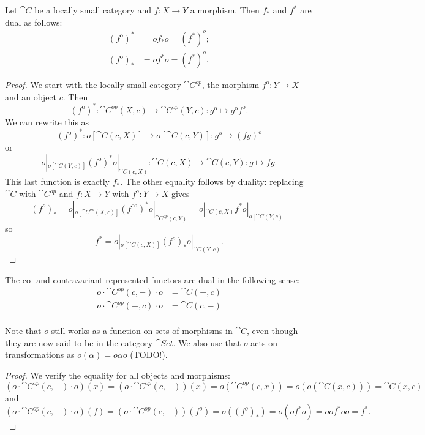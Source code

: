 \begin{proposition}
Let $\cat{C}$ be a locally small category and $f: X\to Y$ a morphism. Then $f_*$ and $f^*$ are dual as follows:
\begin{align*}
(f^\text{o})^* &= of_*o = (f^*)^o; \\
(f^\text{o})_* &= of^*o = (f^*)^o.
\end{align*}
\end{proposition}
\begin{proof}
We start with the locally small category $\cat{C^{op}}$, the morphism $f^\text{o}: Y\to X$ and an object $c$. Then 
\[ (f^\text{o})^*: \cat{C^{op}}(X,c) \to \cat{C^{op}}(Y,c): g^\text{o} \mapsto g^\text{o}f^\text{o}. \]
We can rewrite this as
\[ (f^\text{o})^*: o[\cat{C}(c,X)] \to o[\cat{C}(c,Y)]: g^o \mapsto (fg)^o \]
or
\[ o|_{o[\cat{C}(Y,c)]}(f^\text{o})^*o|_{\cat{C}(c, X)}: \cat{C}(c,X) \to \cat{C}(c,Y): g \mapsto fg. \]
This last function is exactly $f_*$. The other equality follows by duality: replacing $\cat{C}$ with $\cat{C^{op}}$ and $f: X\to Y$ with $f^o: Y\to X$ gives
\[ (f^o)_* = o|_{o[\cat{C^{op}}(X,c)]}(f^\text{oo})^*o|_{\cat{C^{op}}(c, Y)} = o|_{\cat{C}(c,X)}f^*o|_{o[\cat{C}(Y,c)]} \]
so
\[ f^* =  o|_{o[\cat{C}(c,X)]}(f^o)_* o|_{\cat{C}(Y,c)}. \]
\end{proof}
\begin{corollary} \label{corollary:dualityRepresentedFunctors}
The co- and contravariant represented functors are dual in the following sense:
\begin{align*}
o\cdot \cat{C^{op}}(c,-) \cdot o &= \cat{C}(-,c) \\
o\cdot \cat{C^{op}}(-,c) \cdot o &= \cat{C}(c,-) \\
\end{align*}
\end{corollary}
Note that $o$ still works as a function on sets of morphisms in $\cat{C}$, even though they are now said to be in the category $\cat{Set}$. We also use that $o$ acts on transformations as $o(\alpha) = o\alpha o$ (TODO!).
\begin{proof}
We verify the equality for all objects and morphisms:
\[ (o\cdot \cat{C^{op}}(c,-) \cdot o)(x) = (o\cdot \cat{C^{op}}(c,-))(x) = o(\cat{C^{op}}(c,x)) = o(o(\cat{C}(x,c))) = \cat{C}(x,c) \]
and
\[ (o\cdot \cat{C^{op}}(c,-) \cdot o)(f) = (o\cdot \cat{C^{op}}(c,-))(f^o) = o((f^o)_*) =o(of^*o) = oof^*oo = f^*. \]
\end{proof}

